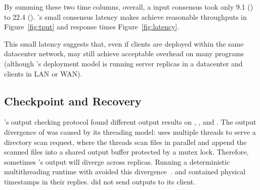 By summing these two time columns, overall, a \xxx input consensus took only
9.1 \us (\redis) to 22.4 \us (\mediatomb). 
\xxx's small consensus latency makes \xxx achieve reasonable throughputs in 
Figure~\ref{fig:tput} and response times Figure~\ref{fig:latency}.

This small latency suggests that, even if clients are deployed within the same
datacenter network, \xxx may still achieve acceptable overhead on many programs
(although \xxx's deployment model is running server replicas in a datacenter and
clients in LAN
or WAN).













\subsection{Checkpoint and Recovery} \label{sec:robust}

\xxx's output checking protocol found different output results on \clamav,
\openldap, and \mediatomb. The output divergence of \clamav was caused by its
threading model: \clamav uses multiple threads to serve a directory scan
request, where the threads scan files in parallel and append the scanned files
into a shared output buffer protected by a mutex lock. Therefore, sometimes
\clamav's output will diverge across replicas. Running a deterministic
multithreading runtime with \clamav avoided this divergence~\cite{crane:sosp15}.
\openldap and \mediatomb contained physical timestamps in their replies.
\calvin did not send outputs to its client.

